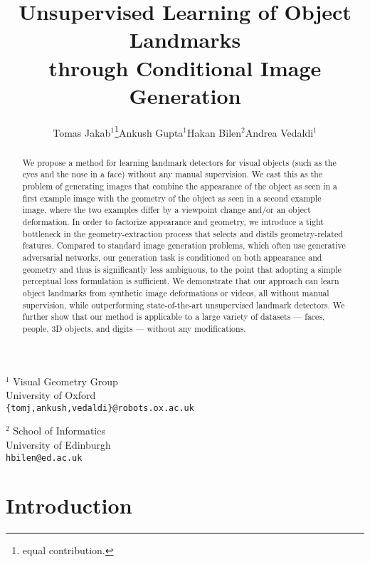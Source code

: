 \documentclass{article}
\title{Unsupervised Learning of Object Landmarks\\ through Conditional Image Generation}
\author{Tomas Jakab$^1$\thanks{equal contribution.}\qquad Ankush Gupta$^1$\footnotemark[1]\qquad Hakan Bilen$^2$\qquad Andrea Vedaldi$^1$}
\begin{document}
\maketitle
{}
\vspace{-1.5em}\begin{minipage}{.49\linewidth}
 	\begin{center}
 		$^1$ Visual Geometry Group\\
 		University of Oxford\\
 		\texttt{\{tomj,ankush,vedaldi\}@robots.ox.ac.uk}  \\
 	\end{center}
 \end{minipage}\begin{minipage}{.49\linewidth}
 	\begin{center}
 		$^2$ School of Informatics\\
 		University of Edinburgh\\
 		\texttt{hbilen@ed.ac.uk}
 	\end{center}
 \end{minipage}\vspace{2em}\begin{abstract}
We propose a method for learning landmark detectors for visual objects (such as the eyes and the nose in a face) without any manual supervision. We cast this as the problem of generating images that combine the appearance of the object as seen in a first example image with the geometry of the object as seen in a second example image, where the two examples differ by a viewpoint change and/or an object deformation. In order to factorize appearance and geometry, we introduce a tight bottleneck in the geometry-extraction process that selects and distils geometry-related features.
Compared to standard image generation problems, which often use generative adversarial networks, our generation task is conditioned on both appearance and geometry and thus is significantly less ambiguous, to the point that adopting a simple perceptual loss formulation is sufficient.
We demonstrate that our approach can learn object landmarks from synthetic image deformations or videos, all without manual supervision, while outperforming state-of-the-art unsupervised landmark detectors.
We further show that our method is applicable to a large variety of datasets --- faces, people, 3D objects, and digits --- without any modifications.
\end{abstract}\section{Introduction}\label{s:intro}
\end{document}
